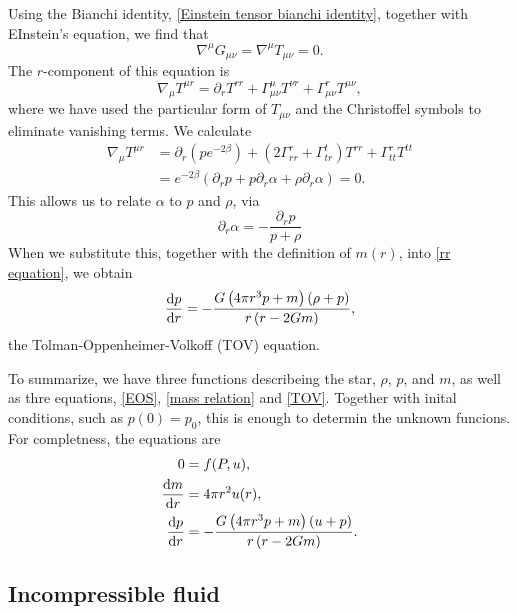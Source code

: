Using the Bianchi identity, \autoref{Einstein tensor bianchi identity}, together with EInstein's equation, we find that
%
\begin{equation}
    \nabla^\mu G_{\mu \nu} = \nabla^\mu T_{\mu \nu} = 0.
\end{equation}
%
The $r$-component of this equation is
%
\begin{equation}
    \nabla_\mu T^{\mu r} 
    =
    \partial_r T^{rr} 
    + \Gamma^\mu_{\mu \nu} T^{\nu r} 
    + \Gamma^r_{\mu \nu} T^{\mu \nu},
\end{equation}
%
where we have used the particular form of $T_{\mu \nu}$ and the Christoffel symbols to eliminate vanishing terms.
We calculate
%
\begin{align*}
    \nabla_\mu T^{\mu r} 
    & = 
    \partial_r \left(p e^{-2\beta}\right)
    + (2 \Gamma^r_{rr} + \Gamma^t_{tr}) T^{rr} 
    + \Gamma^r_{tt}T^{tt} \\ 
    &=   e^{-2\beta} \left( \partial_r p + p \partial_r \alpha + \rho \partial_r \alpha \right) = 0.
\end{align*} 
%
This allows us to relate $\alpha$ to $p$ and $\rho$, via
\begin{equation}
    \partial_r \alpha = - \frac{\partial_r p}{p + \rho}
\end{equation}
When we substitute this, together with the definition of $m(r)$, into \autoref{rr equation}, we obtain
\begin{equation}
    \label{TOV}
    \diff{p}{r}
    =
    -
    \frac{
        G \left(4 \pi r^{3} p + m \right) \left(\rho + p \right)
        }
        {r \left(r- 2 G m\right)},
\end{equation}
the Tolman-Oppenheimer-Volkoff (TOV) equation.

To summarize, we have three functions describeing the star, $\rho$, $p$, and $m$, as well as thre equations, \autoref{EOS}, \autoref{mass relation} and \autoref{TOV}.
Together with inital conditions, such as $p(0) = p_0$, this is enough to determin the unknown funcions.
For completness, the equations are
\begin{align*} 
    0 & = f(P, u) , \\
    \diff{m}{r} & = 4 \pi r^2 u(r), \\
    \diff{p}{r} & =
    -
    \frac{G \left(4 \pi r^{3} p + m \right) \left(u + p \right)}{r \left(r- 2 G m\right)}.
\end{align*}


\subsection*{Incompressible fluid}

